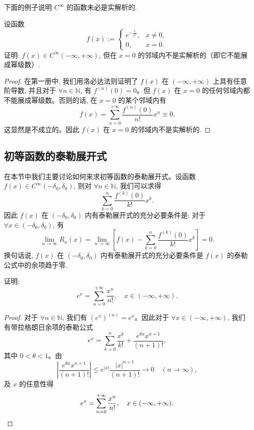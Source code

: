下面的例子说明 $C^\infty$ 的函数未必是实解析的.

\begin{example}\label{example:ma-11-3-1}
设函数
\[
  f(x):=
  \begin{cases}
    e^{-\frac1{x^2}}, & x\ne0,\\
    0, & x=0.
  \end{cases}
\]
证明: $f(x)\in C^\infty(-\infty,+\infty)$, 但在 $x=0$ 的邻域内不是实解析的（即它不能展成幂级数）.
\end{example}


\begin{proof}
在第一册中, 我们用洛必达法则证明了 $f(x)$ 在 $(-\infty,+\infty)$ 上具有任意阶导数, 并且对于 $\forall n\in\mathbb N$, 有 $f^{(n)}(0)=0$。但 $f(x)$ 在 $x=0$ 的任何邻域内都不能展成幂级数。否则的话, 在 $x=0$ 的某个邻域内有
\[
  f(x)=\sum_{n=0}^{+\infty}\frac{f^{(n)}(0)}{n!}x^n\equiv0.
\]
这显然是不成立的。因此 $f(x)$ 在 $x=0$ 的邻域内不是实解析的.
\end{proof}


\subsection{初等函数的泰勒展开式}
\label{subsec:ma-11-3-2}

在本节中我们主要讨论如何来求初等函数的泰勒展开式。设函数
$f(x)\in C^\infty(-\delta_0,\delta_0)$, 则对 $\forall n\in\mathbb N$, 我们可以求得
\[
  \sum_{k=0}^{n}\frac{f^{(k)}(0)}{k!}x^k.
\]
因此 $f(x)$ 在 $(-\delta_0,\delta_0)$ 内有泰勒展开式的充分必要条件是: 对于 $\forall x\in(-\delta_0,\delta_0)$, 有
\[
  \lim_{n\to\infty}R_n(x)
  =
  \lim_{n\to\infty}
  \left[
    f(x)-\sum_{k=0}^{n}\frac{f^{(k)}(0)}{k!}x^k
  \right]
  =0.
\]
换句话说, $f(x)$ 在 $(-\delta_0,\delta_0)$ 内有泰勒展开式的充分必要条件是 $f(x)$ 的泰勒公式中的余项趋于零.

\begin{example}\label{example:ma-11-3-2}
证明:
\[
  e^x=\sum_{n=0}^{+\infty}\frac{x^n}{n!},
  \quad x\in(-\infty,+\infty).
\]
\end{example}


\begin{proof}
对于 $\forall n\in\mathbb N$, 我们有 $(e^x)^{(n)}=e^x$。因此对于 $\forall x\in(-\infty,+\infty)$, 我们有带拉格朗日余项的泰勒公式
\[
  e^x=\sum_{k=0}^{n}\frac{x^k}{k!}
  +\frac{e^{\theta x}x^{n+1}}{(n+1)!},
\]
其中 $0<\theta<1$。由
\[
  \left|\frac{e^{\theta x}x^{n+1}}{(n+1)!}\right|
  \leqslant
  e^{|x|}\frac{|x|^{n+1}}{(n+1)!}
  \to0\quad(n\to\infty),
\]
及 $x$ 的任意性得
\[
  e^x=\sum_{n=0}^{+\infty}\frac{x^n}{n!},
  \quad x\in(-\infty,+\infty).
\qedhere
\]
\end{proof}


